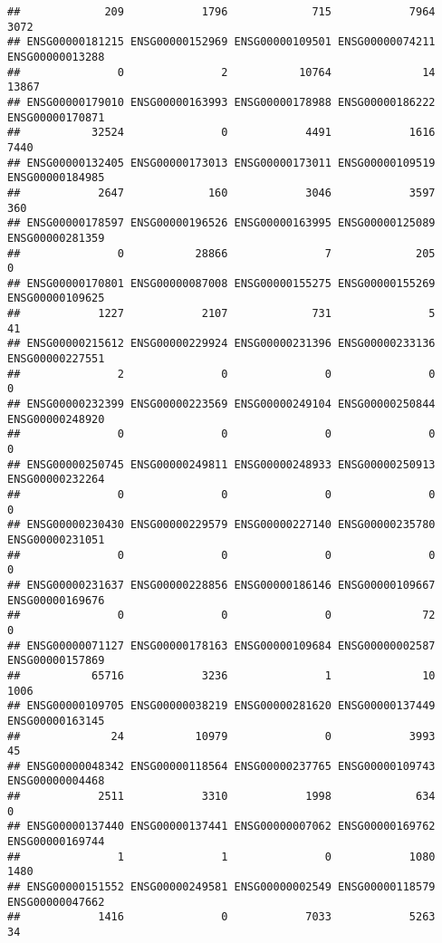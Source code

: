 \documentclass[
]{article}
\begin{document}
\begin{verbatim}
##             209            1796             715            7964            3072 
## ENSG00000181215 ENSG00000152969 ENSG00000109501 ENSG00000074211 ENSG00000013288 
##               0               2           10764              14           13867 
## ENSG00000179010 ENSG00000163993 ENSG00000178988 ENSG00000186222 ENSG00000170871 
##           32524               0            4491            1616            7440 
## ENSG00000132405 ENSG00000173013 ENSG00000173011 ENSG00000109519 ENSG00000184985 
##            2647             160            3046            3597             360 
## ENSG00000178597 ENSG00000196526 ENSG00000163995 ENSG00000125089 ENSG00000281359 
##               0           28866               7             205               0 
## ENSG00000170801 ENSG00000087008 ENSG00000155275 ENSG00000155269 ENSG00000109625 
##            1227            2107             731               5              41 
## ENSG00000215612 ENSG00000229924 ENSG00000231396 ENSG00000233136 ENSG00000227551 
##               2               0               0               0               0 
## ENSG00000232399 ENSG00000223569 ENSG00000249104 ENSG00000250844 ENSG00000248920 
##               0               0               0               0               0 
## ENSG00000250745 ENSG00000249811 ENSG00000248933 ENSG00000250913 ENSG00000232264 
##               0               0               0               0               0 
## ENSG00000230430 ENSG00000229579 ENSG00000227140 ENSG00000235780 ENSG00000231051 
##               0               0               0               0               0 
## ENSG00000231637 ENSG00000228856 ENSG00000186146 ENSG00000109667 ENSG00000169676 
##               0               0               0              72               0 
## ENSG00000071127 ENSG00000178163 ENSG00000109684 ENSG00000002587 ENSG00000157869 
##           65716            3236               1              10            1006 
## ENSG00000109705 ENSG00000038219 ENSG00000281620 ENSG00000137449 ENSG00000163145 
##              24           10979               0            3993              45 
## ENSG00000048342 ENSG00000118564 ENSG00000237765 ENSG00000109743 ENSG00000004468 
##            2511            3310            1998             634               0 
## ENSG00000137440 ENSG00000137441 ENSG00000007062 ENSG00000169762 ENSG00000169744 
##               1               1               0            1080            1480 
## ENSG00000151552 ENSG00000249581 ENSG00000002549 ENSG00000118579 ENSG00000047662 
##            1416               0            7033            5263              34 

\end{verbatim}
\end{document}
